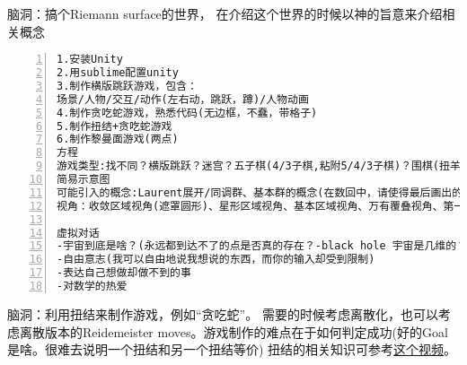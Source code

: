 \documentclass[11pt]{amsart}
\begin{document}
脑洞：搞个Riemann surface的世界， 在介绍这个世界的时候以神的旨意来介绍相关概念
\begin{lstlisting}[numbers=left,numberstyle=\tiny,numbersep=10pt]
1.安装Unity
2.用sublime配置unity
3.制作横版跳跃游戏，包含：
场景/人物/交互/动作(左右动，跳跃，蹲)/人物动画
4.制作贪吃蛇游戏，熟悉代码(无边框，不蠢，带格子)
5.制作扭结+贪吃蛇游戏
6.制作黎曼面游戏(两点)
方程
游戏类型:找不同？横版跳跃？迷宫？五子棋(4/3子棋,粘附5/4/3子棋)？围棋(扭羊头游戏)?跳棋？空间爬行？扭结+贪吃蛇？塔防？数独？数回？华容道？(mini metro？连连看？泡泡龙？消砖块？2048？推箱子？其他的Nikoli Puzzles？)
简易示意图
可能引入的概念:Laurent展开/同调群、基本群的概念(在数回中，请使得最后画出的曲线表示基本群不平凡但是同调群不平凡)/覆叠，万有覆叠，deck transformation(华容道简化难度:允许deck transformation将区块变换至另一个基本区域中相同的位置；或者，我们允许上下粘接)/曲率/曲率驱动游戏/descent(数独解何时能成为更小的黎曼面的解)
视角：收敛区域视角(遮罩圆形)、星形区域视角、基本区域视角、万有覆叠视角、第一人称视角、二维3D视角(视角需要通过"培训+考试"解锁)

虚拟对话
-宇宙到底是啥？(永远都到达不了的点是否真的存在？-black hole 宇宙是几维的？2+3(颜色)+1(时间) 如何测量时间，or时间的流逝是否是均匀的？)
-自由意志(我可以自由地说我想说的东西，而你的输入却受到限制)
-表达自己想做却做不到的事
-对数学的热爱

\end{lstlisting}

脑洞：利用扭结来制作游戏，例如“贪吃蛇”。 需要的时候考虑离散化，也可以考虑离散版本的Reidemeister moves。游戏制作的难点在于如何判定成功(好的Goal是啥。很难去说明一个扭结和另一个扭结等价)
扭结的相关知识可参考\href{https://www.youtube.com/watch?v=nYz3pRk1cCA}{这个视频}。
\end{document}
